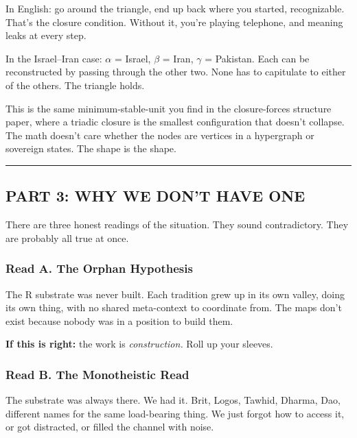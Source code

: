 \documentclass[
]{article}
\begin{document}
In English: go around the triangle, end up back where you started,
recognizable. That's the closure condition. Without it, you're playing
telephone, and meaning leaks at every step.

In the Israel--Iran case: \(\alpha\) = Israel, \(\beta\) = Iran, \(\gamma\) = Pakistan. Each can
be reconstructed by passing through the other two. None has to
capitulate to either of the others. The triangle holds.

This is the same minimum-stable-unit you find in the closure-forces
structure paper, where a triadic closure is the smallest configuration
that doesn't collapse. The math doesn't care whether the nodes are
vertices in a hypergraph or sovereign states. The shape is the shape.

\begin{center}\rule{0.5\linewidth}{0.5pt}\end{center}

\subsection{PART 3: WHY WE DON'T HAVE
ONE}\label{part-3-why-we-dont-have-one}

There are three honest readings of the situation. They sound
contradictory. They are probably all true at once.

\subsubsection{Read A. The Orphan
Hypothesis}\label{read-a.-the-orphan-hypothesis}

The R substrate was never built. Each tradition grew up in its own
valley, doing its own thing, with no shared meta-context to coordinate
from. The maps don't exist because nobody was in a position to build
them.

\textbf{If this is right:} the work is \emph{construction.} Roll up your
sleeves.

\subsubsection{Read B. The Monotheistic
Read}\label{read-b.-the-monotheistic-read}

The substrate was always there. We had it. Brit, Logos, Tawhid, Dharma,
Dao, different names for the same load-bearing thing. We just forgot how
to access it, or got distracted, or filled the channel with noise.
\end{document}
